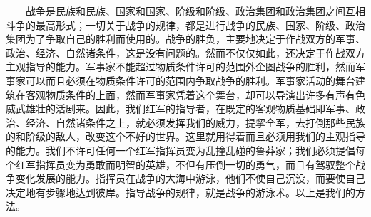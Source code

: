 \documentclass[cn,11pt,chinese]{elegantbook}
\begin{document}
　　战争是民族和民族、国家和国家、阶级和阶级、政治集团和政治集团之间互相斗争的最高形式；一切关于战争的规律，都是进行战争的民族、国家、阶级、政治集团为了争取自己的胜利而使用的。战争的胜负，主要地决定于作战双方的军事、政治、经济、自然诸条件，这是没有问题的。然而不仅仅如此，还决定于作战双方主观指导的能力。军事家不能超过物质条件许可的范围外企图战争的胜利，然而军事家可以而且必须在物质条件许可的范围内争取战争的胜利。军事家活动的舞台建筑在客观物质条件的上面，然而军事家凭着这个舞台，却可以导演出许多有声有色威武雄壮的活剧来。因此，我们红军的指导者，在既定的客观物质基础即军事、政治、经济、自然诸条件之上，就必须发挥我们的威力，提挈全军，去打倒那些民族的和阶级的敌人，改变这个不好的世界。这里就用得着而且必须用我们的主观指导的能力。我们不许可任何一个红军指挥员变为乱撞乱碰的鲁莽家；我们必须提倡每个红军指挥员变为勇敢而明智的英雄，不但有压倒一切的勇气，而且有驾驭整个战争变化发展的能力。指挥员在战争的大海中游泳，他们不使自己沉没，而要使自己决定地有步骤地达到彼岸。指导战争的规律，就是战争的游泳术。以上是我们的方法。\\
\end{document}
